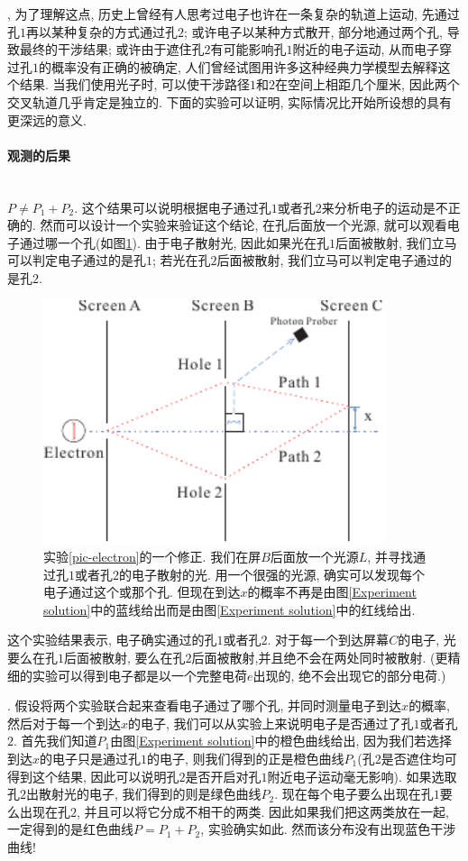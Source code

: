 \documentclass[a4paper,11pt]{article}
\begin{document}
, 为了理解这点, 历史上曾经有人思考过电子也许在一条复杂的轨道上运动, 先通过孔$1$再以某种复杂的方式通过孔$2$; 或许电子以某种方式散开, 部分地通过两个孔, 导致最终的干涉结果; 或许由于遮住孔$2$有可能影响孔$1$附近的电子运动, 从而电子穿过孔$1$的概率没有正确的被确定, 人们曾经试图用许多这种经典力学模型去解释这个结果. 当我们使用光子时, 可以使干涉路径$1$和$2$在空间上相距几个厘米, 因此两个交叉轨道几乎肯定是独立的. 下面的实验可以证明, 实际情况比开始所设想的具有更深远的意义.
\paragraph*{观测的后果}\quad\\
$P\neq P_1+P_2$. 这个结果可以说明根据电子通过孔$1$或者孔$2$来分析电子的运动是不正确的. 然而可以设计一个实验来验证这个结论, 在孔后面放一个光源, 就可以观看电子通过哪一个孔(如图\ref{Choose Experiment}). 由于电子散射光, 因此如果光在孔$1$后面被散射, 我们立马可以判定电子通过的是孔$1$; 若光在孔$2$后面被散射, 我们立马可以判定电子通过的是孔$2$.
\begin{figure}[H]
  \centering
  \includegraphics[width=10cm]{fig7.pdf}
  \caption{实验\ref{pic-electron}的一个修正. 我们在屏$B$后面放一个光源$L$, 并寻找通过孔$1$或者孔$2$的电子散射的光. 用一个很强的光源, 确实可以发现每个电子通过这个或那个孔. 但现在到达$x$的概率不再是由图\ref{Experiment solution}中的蓝线给出而是由图\ref{Experiment solution}中的红线给出.}\label{Choose Experiment}
\end{figure}
这个实验结果表示, 电子确实通过的孔$1$或者孔$2$. 对于每一个到达屏幕$C$的电子, 光要么在孔$1$后面被散射, 要么在孔$2$后面被散射,并且绝不会在两处同时被散射. (更精细的实验可以得到电子都是以一个完整电荷$e$出现的, 绝不会出现它的部分电荷.)

. 假设将两个实验联合起来查看电子通过了哪个孔, 并同时测量电子到达$x$的概率, 然后对于每一个到达$x$的电子, 我们可以从实验上来说明电子是否通过了孔$1$或者孔$2$. 首先我们知道$P_1$由图\ref{Experiment solution}中的橙色曲线给出, 因为我们若选择到达$x$的电子只是通过孔$1$的电子, 则我们得到的正是橙色曲线$P_1$(孔$2$是否遮住均可得到这个结果, 因此可以说明孔$2$是否开启对孔$1$附近电子运动毫无影响). 如果选取孔$2$出散射光的电子, 我们得到的则是绿色曲线$P_2$. 现在每个电子要么出现在孔$1$要么出现在孔$2$, 并且可以将它分成不相干的两类. 因此如果我们把这两类放在一起, 一定得到的是红色曲线$P=P_1+P_2$, 实验确实如此. 然而该分布没有出现蓝色干涉曲线!
\end{document}
